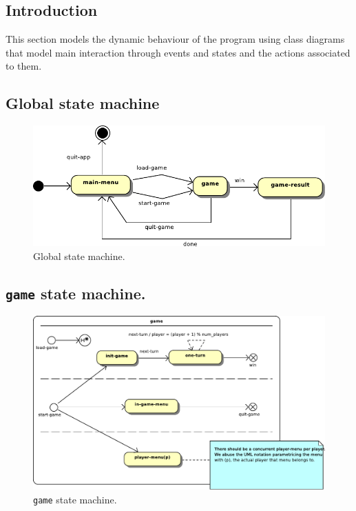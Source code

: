 \documentclass[12pt,a4paper]{article}
\begin{document}
\subsection{Introduction}
This section models the dynamic behaviour of the program using class
diagrams that model main interaction through events and states and the
actions associated to them.

\subsection{Global state machine}
\begin{figure}[h!]
  \centering
  \includegraphics[width=13cm]{pic/1.pdf}
  \caption{Global state machine.}
  \label{fig:sm:global}
\end{figure}

\subsection{\texttt{game} state machine.}
\begin{figure}[H]
  \centering
  \includegraphics[width=15cm]{pic/2.pdf}
  \caption{\texttt{game} state machine.}
  \label{fig:sm:game}
\end{figure}
\end{document}
